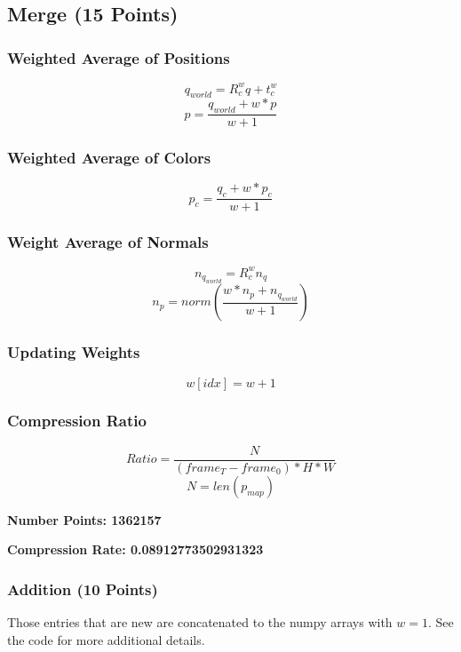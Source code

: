 \documentclass[12pt, a4paper]{article}
\begin{document}
\subsection{Merge (15 Points)}
\subsubsection{Weighted Average of Positions}
$$q_{world} = R_c^w q + t_c^w$$
$$p = \frac{q_{world} + w * p}{w + 1}$$

\subsubsection{Weighted Average of Colors}
$$p_c = \frac{q_c + w * p_c}{w + 1}$$

\subsubsection{Weight Average of Normals}
$$n_{q_{world}} = R_c^w n_{q}$$
$$n_p = norm(\frac{w * n_p + n_{q_{world}}}{w + 1})$$

\subsubsection{Updating Weights}
$$w[idx] = w + 1$$

\subsubsection{Compression Ratio}
$$Ratio = \frac{N}{(frame_{T} - frame_{0}) * H * W}$$
$$N = len(p_{map})$$

\textbf{Number Points: 1362157}

\textbf{Compression Rate: 0.08912773502931323}

\subsubsection{Addition (10 Points)}
Those entries that are new are concatenated to the numpy arrays with $w = 1$. See the code for more additional details.
\end{document}
